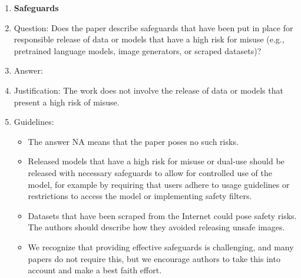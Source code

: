 \documentclass{article}
\begin{document}
\begin{enumerate}
\item {\bf Safeguards}
    \item[] Question: Does the paper describe safeguards that have been put in place for responsible release of data or models that have a high risk for misuse (e.g., pretrained language models, image generators, or scraped datasets)?
    \item[] Answer: \answerNA{}
    \item[] Justification: The work does not involve the release of data or models that present a high risk of misuse.
    \item[] Guidelines:
    \begin{itemize}
        \item The answer NA means that the paper poses no such risks.
        \item Released models that have a high risk for misuse or dual-use should be released with necessary safeguards to allow for controlled use of the model, for example by requiring that users adhere to usage guidelines or restrictions to access the model or implementing safety filters. 
        \item Datasets that have been scraped from the Internet could pose safety risks. The authors should describe how they avoided releasing unsafe images.
        \item We recognize that providing effective safeguards is challenging, and many papers do not require this, but we encourage authors to take this into account and make a best faith effort.
    \end{itemize}


\end{enumerate}
\end{document}
